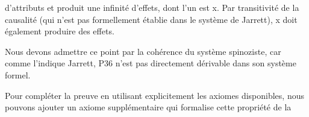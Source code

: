 \documentclass[10pt]{report}
\begin{document}
\begin{coqdoccode}
\begin{coqdoccomment}
d'attributs\coqdocindent{0.50em}
et\coqdocindent{0.50em}
produit\coqdocindent{0.50em}
une\coqdocindent{0.50em}
infinité\coqdocindent{0.50em}
d'effets,\coqdoceol
\coqdocindent{3.50em}
dont\coqdocindent{0.50em}
l'un\coqdocindent{0.50em}
est\coqdocindent{0.50em}
x.\coqdocindent{0.50em}
Par\coqdocindent{0.50em}
transitivité\coqdocindent{0.50em}
de\coqdocindent{0.50em}
la\coqdocindent{0.50em}
causalité\coqdocindent{0.50em}
(qui\coqdocindent{0.50em}
n'est\coqdocindent{0.50em}
pas\coqdocindent{0.50em}
formellement\coqdoceol
\coqdocindent{3.50em}
établie\coqdocindent{0.50em}
dans\coqdocindent{0.50em}
le\coqdocindent{0.50em}
système\coqdocindent{0.50em}
de\coqdocindent{0.50em}
Jarrett),\coqdocindent{0.50em}
x\coqdocindent{0.50em}
doit\coqdocindent{0.50em}
également\coqdocindent{0.50em}
produire\coqdocindent{0.50em}
des\coqdocindent{0.50em}
effets.\coqdocindent{0.50em}
\end{coqdoccomment}
\coqdoceol
\coqdocemptyline
\coqdocindent{2.00em}
\begin{coqdoccomment}
\coqdocindent{0.50em}
Nous\coqdocindent{0.50em}
devons\coqdocindent{0.50em}
admettre\coqdocindent{0.50em}
ce\coqdocindent{0.50em}
point\coqdocindent{0.50em}
par\coqdocindent{0.50em}
la\coqdocindent{0.50em}
cohérence\coqdocindent{0.50em}
du\coqdocindent{0.50em}
système\coqdocindent{0.50em}
spinoziste,\coqdocindent{0.50em}
car\coqdocindent{0.50em}
comme\coqdocindent{0.50em}
\coqdoceol
\coqdocindent{3.50em}
l'indique\coqdocindent{0.50em}
Jarrett,\coqdocindent{0.50em}
P36\coqdocindent{0.50em}
n'est\coqdocindent{0.50em}
pas\coqdocindent{0.50em}
directement\coqdocindent{0.50em}
dérivable\coqdocindent{0.50em}
dans\coqdocindent{0.50em}
son\coqdocindent{0.50em}
système\coqdocindent{0.50em}
formel.\coqdocindent{0.50em}
\end{coqdoccomment}
\coqdoceol
\coqdocemptyline
\coqdocindent{2.00em}
\begin{coqdoccomment}
\coqdocindent{0.50em}
Pour\coqdocindent{0.50em}
compléter\coqdocindent{0.50em}
la\coqdocindent{0.50em}
preuve\coqdocindent{0.50em}
en\coqdocindent{0.50em}
utilisant\coqdocindent{0.50em}
explicitement\coqdocindent{0.50em}
les\coqdocindent{0.50em}
axiomes\coqdocindent{0.50em}
disponibles,\coqdoceol
\coqdocindent{3.50em}
nous\coqdocindent{0.50em}
pouvons\coqdocindent{0.50em}
ajouter\coqdocindent{0.50em}
un\coqdocindent{0.50em}
axiome\coqdocindent{0.50em}
supplémentaire\coqdocindent{0.50em}
qui\coqdocindent{0.50em}
formalise\coqdocindent{0.50em}
cette\coqdocindent{0.50em}
propriété\coqdoceol
\coqdocindent{3.50em}
de\coqdocindent{0.50em}
la\coqdocindent{0.50em}

\end{coqdoccomment}
\end{coqdoccode}
\end{document}
